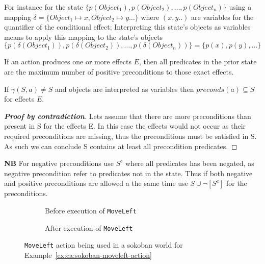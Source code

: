 \documentclass[\master/Master.tex]{subfiles}
\begin{document}
For instance for the state
$\{ p(Object_1), p(Object_2),\ldots,p(Object_n)\}$ using a mapping
$\delta = \{Object_1 \mapsto x, Object_2 \mapsto y \ldots\}$
where $(x, y..)$ are variables for the quantifier of the conditional effect; Interpreting this state's objects as variables means to apply this mapping to the state's objects
\begin{equation*}
\{ p(\delta(Object_1)), p(\delta(Object_2)),\ldots,p(\delta(Object_n))\} = \{ p(x), p(y),\ldots\}
\end{equation*}

\begin{theorem}\label{thm:ca:precondition-state}
If an action produces one or more effects $E$, then all predicates in the prior state are the maximum number of positive preconditions to those exact effects.

If $\gamma (S,a) \neq S$ and objects are interpreted as variables then $preconds(a) \subseteq S$  for effects $E$.

\begin{proof}[\textbf{Proof by contradiction}] Lets assume that there are more preconditions than present in S for the effects E.
	In this case the effects would not occur as their required preconditions are missing, thus the preconditions must be satisfied in S.
	As such we can conclude S contains at least all precondition predicates.
\end{proof}
\end{theorem}

\textbf{NB} For negative preconditions use $S^c$ where all predicates has been negated, as negative precondition refer to predicates not in the state.
Thus if both negative and positive preconditions are allowed a the same time use  $S \cup \neg[S^c] $ for the preconditions.

\begin{figure}
    \hspace*{0.1\textwidth}%
    \begin{subfigure}{0.35\textwidth}
        \centering
        \resizebox{\linewidth}{!}{}
        \caption{Before execution of \texttt{MoveLeft}}
    \end{subfigure}%
    \hspace*{0.1\textwidth}%
    \begin{subfigure}{0.35\textwidth}
        \centering
        \resizebox{\linewidth}{!}{}
        \caption{After execution of \texttt{MoveLeft}}
    \end{subfigure}
    \hspace*{0.1\textwidth}
	\caption{\label{fig:ca:sokoban-moveleft-action}\texttt{MoveLeft} action being used in a sokoban world for Example~\ref{ex:ca:sokoban-moveleft-action} }

\end{figure}
\end{document}

